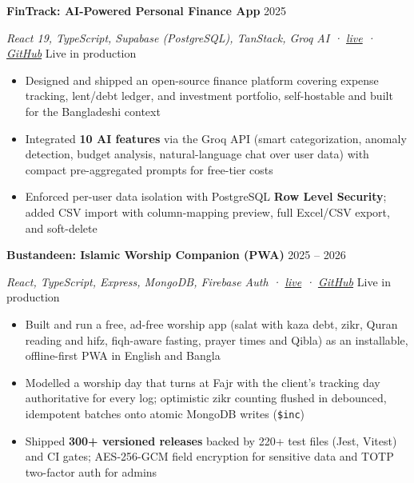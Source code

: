 \documentclass[11pt]{article}
\newcommand{\entry}[2]{\textbf{#1} \hfill {\small #2}\par}
\newcommand{\subentry}[2]{\textit{#1} \hfill {\small #2}\par}
\begin{document}
\entry{FinTrack: AI-Powered Personal Finance App}{2025}
\subentry{React 19, TypeScript, Supabase (PostgreSQL), TanStack, Groq AI \;·\; \href{https://fin-track-eight-blue.vercel.app}{live} \;·\; \href{https://github.com/isttiiak/FinTrack}{GitHub}}{Live in production}
\begin{itemize}
  \item Designed and shipped an open-source finance platform covering expense tracking, lent/debt ledger, and investment portfolio, self-hostable and built for the Bangladeshi context
  \item Integrated \textbf{10 AI features} via the Groq API (smart categorization, anomaly detection, budget analysis, natural-language chat over user data) with compact pre-aggregated prompts for free-tier costs
  \item Enforced per-user data isolation with PostgreSQL \textbf{Row Level Security}; added CSV import with column-mapping preview, full Excel/CSV export, and soft-delete
\end{itemize}
\vspace{5pt}

\entry{Bustandeen: Islamic Worship Companion (PWA)}{2025 -- 2026}
\subentry{React, TypeScript, Express, MongoDB, Firebase Auth \;·\; \href{https://bustandeen.com}{live} \;·\; \href{https://github.com/isttiiak/bustandeen-web-app}{GitHub}}{Live in production}
\begin{itemize}
  \item Built and run a free, ad-free worship app (salat with kaza debt, zikr, Quran reading and hifz, fiqh-aware fasting, prayer times and Qibla) as an installable, offline-first PWA in English and Bangla
  \item Modelled a worship day that turns at Fajr with the client's tracking day authoritative for every log; optimistic zikr counting flushed in debounced, idempotent batches onto atomic MongoDB writes (\texttt{\$inc})
  \item Shipped \textbf{300+ versioned releases} backed by 220+ test files (Jest, Vitest) and CI gates; AES-256-GCM field encryption for sensitive data and TOTP two-factor auth for admins
\end{itemize}
\vspace{5pt}
\end{document}
